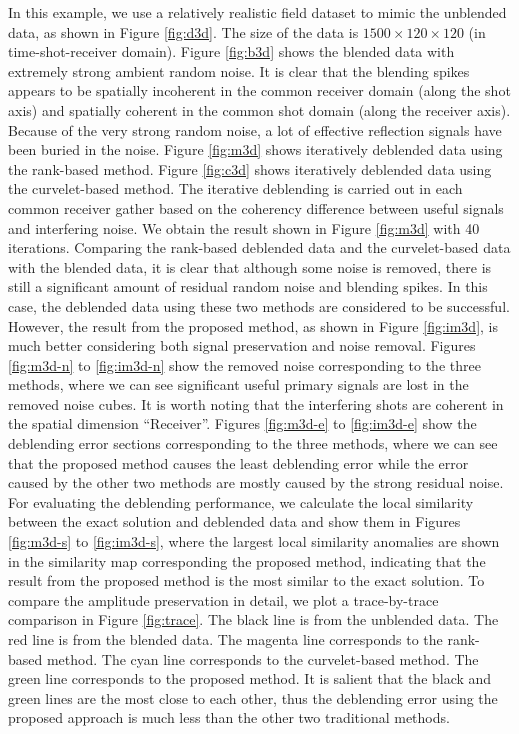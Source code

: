 In this example, we use a relatively realistic field dataset to mimic the unblended data, as shown in Figure \ref{fig:d3d}.  The size of the data is $1500\times 120\times120$ (in time-shot-receiver domain). Figure \ref{fig:b3d} shows the blended data with extremely strong ambient random noise.  It is clear that the blending spikes appears to be spatially incoherent in the common receiver domain (along the shot axis) and spatially coherent in the common shot domain (along the receiver axis). Because of the very strong random noise, a lot of effective reflection signals have been buried in the noise. Figure \ref{fig:m3d} shows iteratively deblended data using the rank-based method. Figure \ref{fig:c3d} shows iteratively deblended data using the curvelet-based method. The iterative deblending is carried out in each common receiver gather based on the coherency difference between useful signals and interfering noise. We obtain the result shown in Figure \ref{fig:m3d} with 40 iterations. Comparing the rank-based deblended data and the curvelet-based data with the blended data, it is clear that although some noise is removed, there is still a significant amount of residual random noise and blending spikes. In this case, the deblended data using these two methods are considered to be successful. However, the result from the proposed method, as shown in Figure \ref{fig:im3d}, is much better considering both signal preservation and noise removal. Figures \ref{fig:m3d-n} to \ref{fig:im3d-n} show the removed noise corresponding to the three methods, where we can see significant useful primary signals are lost in the removed noise cubes. It is worth noting that the interfering shots are coherent in the spatial dimension ``Receiver''. Figures \ref{fig:m3d-e} to \ref{fig:im3d-e} show the deblending error sections corresponding to the three methods, where we can see that the proposed method causes the least deblending error while the error caused by the other two methods are mostly caused by the strong residual noise. For evaluating the deblending performance, we calculate the local similarity between the exact solution and deblended data and show them in Figures \ref{fig:m3d-s} to \ref{fig:im3d-s}, where the largest local similarity anomalies are shown in the similarity map corresponding the proposed method, indicating that the result from the proposed method is the most similar to the exact solution. To compare the amplitude preservation in detail, we plot a trace-by-trace comparison in Figure \ref{fig:trace}. The black line is from the unblended data. The red line is from the blended data. The magenta line corresponds to the rank-based method. The cyan line corresponds to the curvelet-based method. The green line corresponds to the proposed method. It is salient that the black and green lines are the most close to each other, thus the deblending error using the proposed approach is much less than the other two traditional methods. 

